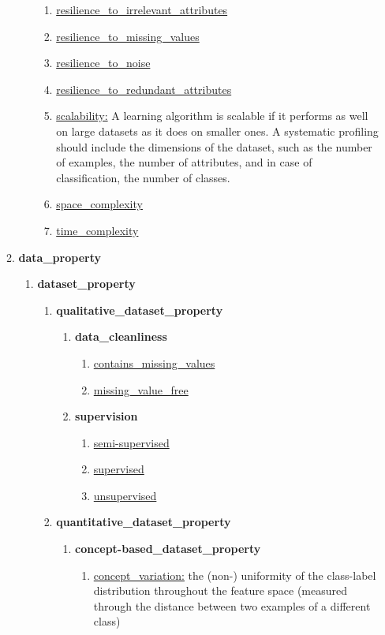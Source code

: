 \documentclass[a4paper,12pt, english]{article}
\begin{document}
\begin{enumerate}
\begin{enumerate}
\begin{enumerate}
\begin{enumerate}
		\item \underline{resilience\_to\_irrelevant\_attributes}
		\item \underline{resilience\_to\_missing\_values}
		\item \underline{resilience\_to\_noise}
		\item \underline{resilience\_to\_redundant\_attributes}
		\item \underline{scalability:} A learning algorithm is scalable if it performs as well on large datasets as it does on smaller ones. A systematic profiling should include the dimensions of the dataset, such as the number of examples, the number of attributes, and in case of classification, the number of classes. 
		\item \underline{space\_complexity}
		\item \underline{time\_complexity}
		\end{enumerate}
	\end{enumerate}
\item \textbf{data\_property}
\begin{enumerate}
	\item \textbf{ dataset\_property}
		\begin{enumerate}
		\item \textbf{ qualitative\_dataset\_property}
			\begin{enumerate}
			\item \textbf{ data\_cleanliness}
				\begin{enumerate}
				\item \underline{contains\_missing\_values}
				\item \underline{missing\_value\_free}
				\end{enumerate}
			\item \textbf{supervision}
				\begin{enumerate}
				\item \underline{semi-supervised}
				\item \underline{supervised}
				\item \underline{unsupervised}
				\end{enumerate}
			\end{enumerate}
		\item \textbf{quantitative\_dataset\_property}
			\begin{enumerate}
			\item \textbf{concept-based\_dataset\_property}
				\begin{enumerate}
				\item \underline{concept\_variation:} the (non-) uniformity of the class-label distribution throughout the feature space (measured through the distance between two examples of a different class)

\end{enumerate}
\end{enumerate}
\end{enumerate}
\end{enumerate}
\end{enumerate}
\end{enumerate}
\end{document}
